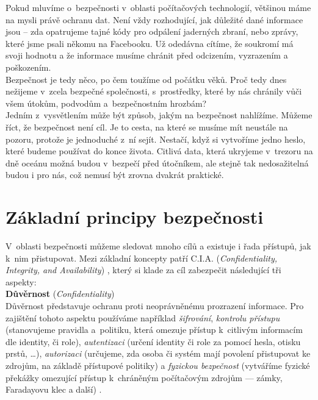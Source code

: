 Pokud mluvíme o~bezpečnosti v~oblasti počítačových technologií, většinou máme na mysli právě ochranu dat. Není vždy rozhodující, jak důležité dané 
informace jsou – zda opatrujeme tajné kódy pro odpálení jaderných zbraní, nebo zprávy, které jsme psali někomu na Facebooku. Už odedávna cítíme, 
že soukromí má svoji hodnotu a že informace musíme chránit před odcizením, vyzrazením a poškozením. \\

Bezpečnost je tedy něco, po čem toužíme od počátku věků. Proč tedy dnes nežijeme v~zcela bezpečné společnosti, 
s~prostředky, které by nás chránily vůči všem útokům, podvodům a~bezpečnostním hrozbám? \\

Jedním z~vysvětlením může být způsob, jakým na bezpečnost nahlížíme. Můžeme říct, že  bezpečnost není cíl. Je to cesta, na které se musíme mít 
neustále na pozoru, protože je jednoduché z~ní sejít. Nestačí, když si vytvoříme jedno heslo, které budeme používat do konce života. Citlivá data, 
která ukryjeme v~trezoru na dně oceánu možná budou v~bezpečí před útočníkem, ale stejně tak nedosažitelná budou i pro nás, což nemusí být zrovna 
dvakrát praktické. 

\section{Základní principy bezpečnosti} \label{sec:3:principles}
V~oblasti bezpečnosti můžeme sledovat mnoho cílů a existuje i řada přístupů, jak k~nim přistupovat. Mezi základní koncepty patří C.I.A. 
(\textit{Confidentiality, Integrity, and Availability}) \cite[str. 3]{Goodrich2011}, který si klade za cíl zabezpečit následující tři aspekty: \\

\textbf{Důvěrnost} (\textit{Confidentiality}) \\
Důvěrnost představuje ochranu proti neoprávněnému prozrazení informace. Pro zajištění tohoto aspektu používáme například \textit{šifrování}, 
\textit{kontrolu přístupu} (stanovujeme pravidla a~politiku, která omezuje přístup k~citlivým informacím dle identity, či role), \textit{autentizaci} 
(určení identity či role za pomocí hesla, otisku prstů, \dots), \textit{autorizaci} (určujeme, zda osoba či systém mají povolení přistupovat 
ke zdrojům, na základě přístupové politiky) a \textit{fyzickou bezpečnost} (vytváříme fyzické překážky omezující přístup k~chráněným počítačovým 
zdrojům --- zámky, Faradayovu klec a další) \cite[str. 4-5]{Goodrich2011}. \\

